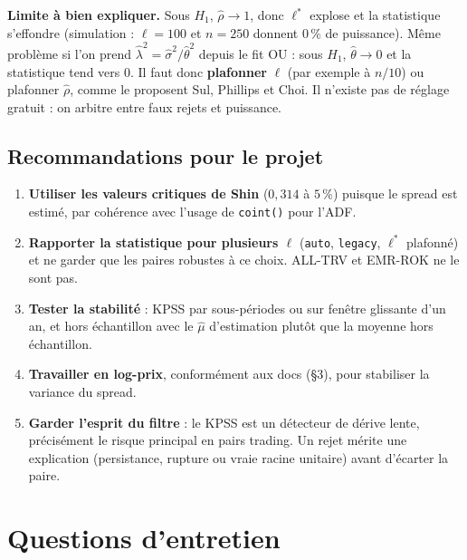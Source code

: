 \documentclass[11pt,a4paper]{article}
\newcommand{\code}[1]{\texttt{#1}}
\theoremstyle{definition}
\begin{document}
\textbf{Limite à bien expliquer.} Sous $H_1$, $\hat\rho \to 1$, donc $\ell^*$ explose et la statistique s'effondre (simulation : $\ell = 100$ et $n = 250$ donnent $0\,\%$ de puissance). Même problème si l'on prend $\hat\lambda^2 = \hat\sigma^2/\hat\theta^2$ depuis le fit OU : sous $H_1$, $\hat\theta \to 0$ et la statistique tend vers $0$. Il faut donc \textbf{plafonner} $\ell$ (par exemple à $n/10$) ou plafonner $\hat\rho$, comme le proposent Sul, Phillips et Choi. Il n'existe pas de réglage gratuit : on arbitre entre faux rejets et puissance.

\subsection{Recommandations pour le projet}

\begin{enumerate}
\item \textbf{Utiliser les valeurs critiques de Shin} ($0{,}314$ à $5\,\%$) puisque le spread est estimé, par cohérence avec l'usage de \code{coint()} pour l'ADF.
\item \textbf{Rapporter la statistique pour plusieurs $\ell$} (\code{auto}, \code{legacy}, $\ell^*$ plafonné) et ne garder que les paires robustes à ce choix. ALL-TRV et EMR-ROK ne le sont pas.
\item \textbf{Tester la stabilité} : KPSS par sous-périodes ou sur fenêtre glissante d'un an, et hors échantillon avec le $\hat\mu$ d'estimation plutôt que la moyenne hors échantillon.
\item \textbf{Travailler en log-prix}, conformément aux docs (\S3), pour stabiliser la variance du spread.
\item \textbf{Garder l'esprit du filtre} : le KPSS est un détecteur de dérive lente, précisément le risque principal en pairs trading. Un rejet mérite une explication (persistance, rupture ou vraie racine unitaire) avant d'écarter la paire.
\end{enumerate}

\section{Questions d'entretien}
\end{document}
